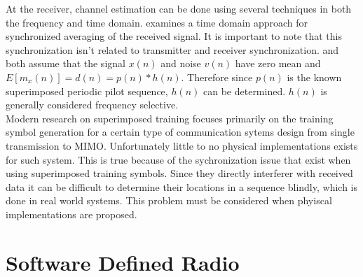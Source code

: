 \documentclass[11pt]{mvlthesis}
\begin{document}
At the receiver, channel estimation can be done using several techniques in both the frequency and time domain.  \cite{17} examines a time domain approach for synchronized averaging of the received signal.  It is important to note that this synchronization isn't related to transmitter and receiver synchronization.  \cite{17} and \cite{18} both assume that the signal \( x(n)\) and noise \( v(n) \) have zero mean and \(E[m_{x}(n)] = d(n) = p(n) \ast h(n)\).  Therefore since \(p(n) \) is the known superimposed periodic pilot sequence, \(h(n)\) can be determined.  \(h(n)\) is generally considered frequency selective.\\

Modern research on superimposed training focuses primarily on the training symbol generation for a certain type of communication sytems design from single transmission to MIMO.  Unfortunately little to no physical implementations exists for such system.  This is true because of the sychronization issue that exist when using superimposed training symbols.  Since they directly interferer with received data it can be difficult to determine their locations in a sequence blindly, which is done in real world systems.  This problem must be considered when phyiscal implementations are proposed.\\

\section{Software Defined Radio}













%


\end{document}
